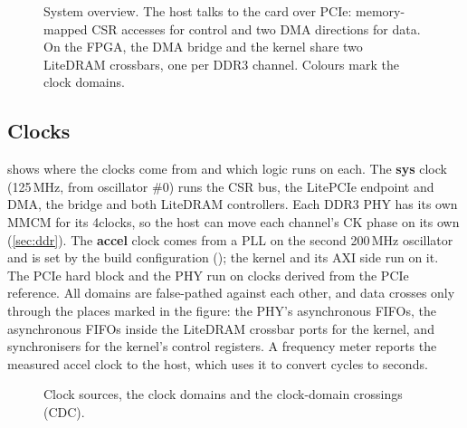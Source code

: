 \begin{figure}[t]
  \centering
  \resizebox{\linewidth}{!}{}
  \caption{System overview. The host talks to the card over PCIe: memory-mapped CSR accesses for control and two
    DMA directions for data. On the FPGA, the DMA bridge and the kernel share two LiteDRAM crossbars, one per DDR3
    channel. Colours mark the clock domains.}
  \label{fig:system}
\end{figure}

\subsection{Clocks}
 shows where the clocks come from and which logic runs on each. The \textbf{sys} clock
(125\,MHz, from oscillator \#0) runs the CSR bus, the LitePCIe endpoint and DMA, the bridge and both LiteDRAM
controllers. Each DDR3 PHY has its own MMCM for its 4\x clocks, so the host can move each channel's CK phase on its
own (\cref{sec:ddr}). The \textbf{accel} clock comes from a PLL on the second 200\,MHz oscillator and is set by the
build configuration (); the kernel and its AXI side run on it. The PCIe hard block and the
PHY run on clocks derived from the PCIe reference. All domains are false-pathed against each other, and data
crosses only through the places marked in the figure: the PHY's asynchronous FIFOs, the asynchronous FIFOs inside
the LiteDRAM crossbar ports for the kernel, and synchronisers for the kernel's control registers. A frequency meter
reports the measured accel clock to the host, which uses it to convert cycles to seconds.

\begin{figure}[t]
  \centering
  \resizebox{\linewidth}{!}{}
  \caption{Clock sources, the clock domains and the clock-domain crossings (CDC).}
  \label{fig:clocks}
\end{figure}
